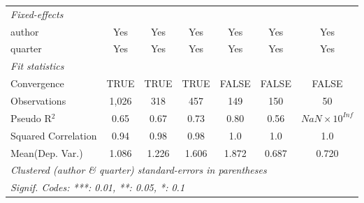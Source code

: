 \begin{tabular}{lcccccc}
   \midrule
   \emph{Fixed-effects}\\
   author                                                     & Yes           & Yes         & Yes         & Yes           & Yes                      & Yes\\  
   quarter                                                    & Yes           & Yes         & Yes         & Yes           & Yes                      & Yes\\  
   \midrule
   \emph{Fit statistics}\\
   Convergence                                                &TRUE           & TRUE        & TRUE        & FALSE         & FALSE                    & FALSE\\  
   Observations                                               & 1,026         & 318         & 457         & 149           & 150                      & 50\\  
   Pseudo R$^2$                                               & 0.65          & 0.67        & 0.73        & 0.80          & 0.56                     & $NaN\times 10^{Inf}$\\   
   Squared Correlation                                        & 0.94          & 0.98        & 0.98        & 1.0           & 1.0                      & 1.0\\  
Mean(Dep. Var.) & 1.086 & 1.226 & 1.606 & 1.872 & 0.687 & 0.720 \\
   \midrule \midrule
   \multicolumn{7}{l}{\emph{Clustered (author \& quarter) standard-errors in parentheses}}\\
   \multicolumn{7}{l}{\emph{Signif. Codes: ***: 0.01, **: 0.05, *: 0.1}}\\
\end{tabular}
\par\endgroup

